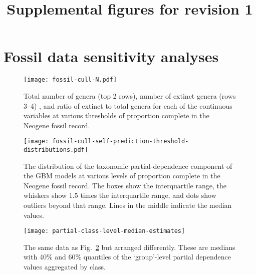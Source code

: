 \documentclass[11pt]{article}
\title{Supplemental figures for revision 1}
\author{}
\begin{document}
\maketitle

\section{Fossil data sensitivity analyses}



\begin{figure}[htbp]
\begin{center}
\texttt{[image: fossil-cull-N.pdf]}
\caption{Total number of genera (top 2 rows), number of extinct genera (rows 3--4) , and ratio of extinct to total genera for each of the continuous variables at various thresholds of proportion complete in the Neogene fossil record.}
\label{fig:raw-predictor-paleo-culls}
\end{center}
\end{figure}

\clearpage



\begin{figure}[htbp]
\begin{center}
\texttt{[image: fossil-cull-self-prediction-threshold-distributions.pdf]}
\caption{The distribution of the taxonomic partial-dependence component of the GBM models at various levels of proportion complete in the Neogene fossil record. The boxes show the interquartile range, the whiskers show 1.5 times the interquartile range, and dots show outliers beyond that range. Lines in the middle indicate the median values.}
\label{fig:ext-boxplots-paleo-culls}
\end{center}
\end{figure}

\clearpage

\begin{figure}[htbp]
\begin{center}
\texttt{[image: partial-class-level-median-estimates]}
\caption{The same data as Fig.~\ref{fig:ext-boxplots-paleo-culls} but arranged differently. These are medians with 40\% and 60\% quantiles of the `group'-level partial dependence values aggregated by class.}
\label{fig:class-level-partial-order}
\end{center}
\end{figure}
\end{document}
